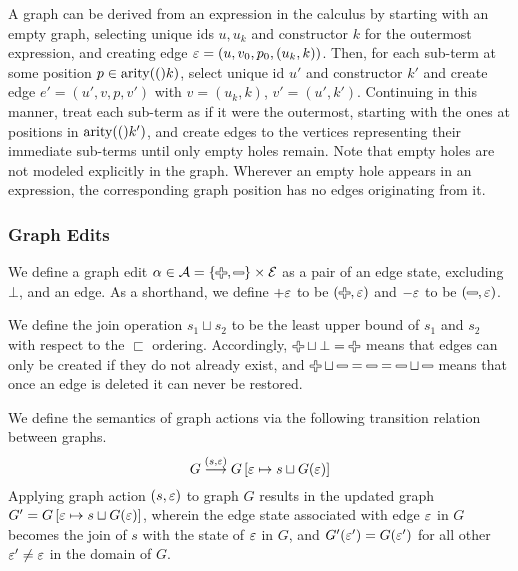 
\vspace*{\baselineskip}

A graph can be derived from an expression in the calculus by starting with an
empty graph, selecting unique ids $u, u_k$ and constructor $k$ for the outermost
expression, and creating edge $\varepsilon = (u, v_0, p_0, (u_k, k))$. Then, for each
sub-term at some position $p \in \operatorname{\text{arity}}\mathopen{}\left((\right)\mathclose{}k)$, select unique id $u'$ and
constructor $k'$ and create edge $e' = (u', v, p, v')$ with $v = (u_k, k)$, $v'
= (u', k')$. Continuing in this manner, treat each sub-term as if it were the
outermost, starting with the ones at positions in $\operatorname{\text{arity}}\mathopen{}\left((\right)\mathclose{}k')$, and create edges
to the vertices representing their immediate sub-terms until only empty holes
remain. Note that empty holes are not modeled explicitly in the graph. Wherever
an empty hole appears in an expression, the corresponding graph position has no
edges originating from it.


\subsubsection{Graph Edits}%
\label{sub:Graph Edits}

We define a graph edit $\alpha \in \A = \left\{\Plus, \Minus\right\} \times \E$
as a pair of an edge state, excluding $\bot$, and an edge. As a shorthand, we
define $+\varepsilon$ to be $(\Plus, \e)$ and $-\varepsilon$ to be $(\Minus, \e)$.

We define the join operation $s_1 \sqcup s_2$ to be the least upper bound of
$s_1$ and $s_2$ with respect to the $\sqsubset$ ordering. Accordingly, $\Plus
\sqcup \bot = \Plus$ means that edges can only be created if they do not already
exist, and $\Plus \sqcup \Minus = \Minus = \Minus \sqcup \Minus$ means that once
an edge is deleted it can never be restored.

We define the semantics of graph actions via the following transition relation
between graphs.
\[
  G \overset{(s,\varepsilon)}{\longrightarrow} G\left[ \varepsilon \mapsto s \sqcup G(\varepsilon) \right]
\]
Applying graph action $\left(s, \varepsilon\right)$ to graph $G$ results in the
updated graph $G' = G\left[\varepsilon \mapsto s \sqcup G(\varepsilon) \right]$, wherein the edge
state associated with edge $\varepsilon$ in $G$ becomes the join of $s$ with the state of
$\varepsilon$ in $G$, and $G'(\varepsilon') = G(\varepsilon')$ for all other $\varepsilon' \ne \varepsilon$ in the domain of
$G$.

